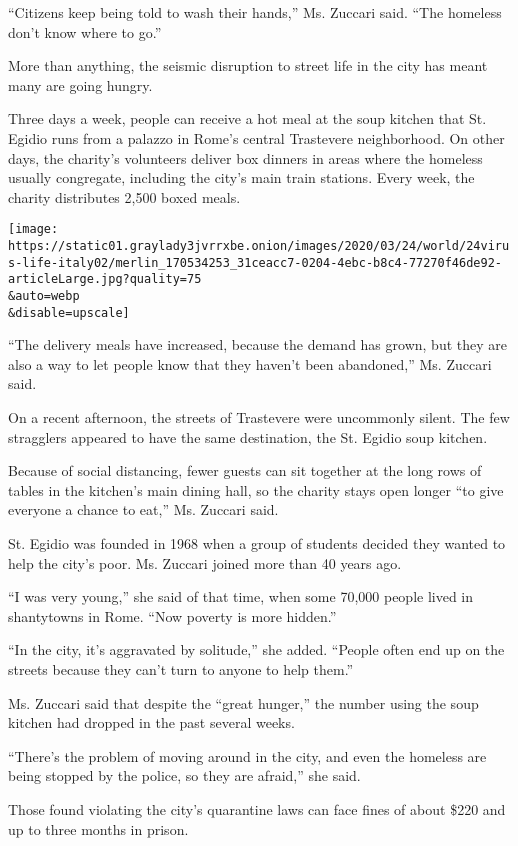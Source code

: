 ``Citizens keep being told to wash their hands,'' Ms. Zuccari said.
``The homeless don't know where to go.''

More than anything, the seismic disruption to street life in the city
has meant many are going hungry.

Three days a week, people can receive a hot meal at the soup kitchen
that St. Egidio runs from a palazzo in Rome's central Trastevere
neighborhood. On other days, the charity's volunteers deliver box
dinners in areas where the homeless usually congregate, including the
city's main train stations. Every week, the charity distributes 2,500
boxed meals.

\texttt{[image: https://static01.graylady3jvrrxbe.onion/images/2020/03/24/world/24virus-life-italy02/merlin\_170534253\_31ceacc7-0204-4ebc-b8c4-77270f46de92-articleLarge.jpg?quality=75\\\&auto=webp\\\&disable=upscale]}

``The delivery meals have increased, because the demand has grown, but
they are also a way to let people know that they haven't been
abandoned,'' Ms. Zuccari said.

On a recent afternoon, the streets of Trastevere were uncommonly silent.
The few stragglers appeared to have the same destination, the St. Egidio
soup kitchen.

Because of social distancing, fewer guests can sit together at the long
rows of tables in the kitchen's main dining hall, so the charity stays
open longer ``to give everyone a chance to eat,'' Ms. Zuccari said.

St. Egidio was founded in 1968 when a group of students decided they
wanted to help the city's poor. Ms. Zuccari joined more than 40 years
ago.

``I was very young,'' she said of that time, when some 70,000 people
lived in shantytowns in Rome. ``Now poverty is more hidden.''

``In the city, it's aggravated by solitude,'' she added. ``People often
end up on the streets because they can't turn to anyone to help them.''

Ms. Zuccari said that despite the ``great hunger,'' the number using the
soup kitchen had dropped in the past several weeks.

``There's the problem of moving around in the city, and even the
homeless are being stopped by the police, so they are afraid,'' she
said.

Those found violating the city's quarantine laws can face fines of about
\$220 and up to three months in prison.

